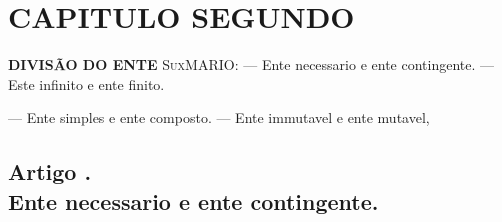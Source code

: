 

\chapter*{CAPITULO SEGUNDO}

 \textbf{DIVISÃO DO ENTE} \textsc{SuxMARIO}: --- Ente necessario e ente contingente. --- Este infinito e ente finito.

--- Ente simples e ente composto. --- Ente immutavel e ente mutavel,


\section*{Artigo \textbar{}.\\ Ente necessario e ente contingente.}

